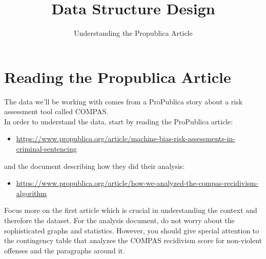 \documentclass[12pt]{article}
\title{Data Structure Design}
\date{Understanding the Propublica Article} %
\begin{document}
\maketitle

\section{Reading the Propublica Article}
The data we'll be working with comes from a ProPublica story about a risk assessment tool called COMPAS.
\newline \\
In order to understand the data, start by reading the ProPublica article:
\begin{itemize}
\item \url{https://www.propublica.org/article/machine-bias-risk-assessments-in-criminal-sentencing}
\end{itemize}
and the document describing how they did their analysis:
\begin{itemize}
\item \url{https://www.propublica.org/article/how-we-analyzed-the-compas-recidivism-algorithm} \\
\end{itemize}
Focus more on the first article which is crucial in understanding the context and therefore the dataset. For the analysis document, do not worry about the sophisticated graphs and statistics. However, you should give special attention to the contingency table that analyzes the COMPAS recidivism score for non-violent offenses and the paragraphs around it.
\end{document}

